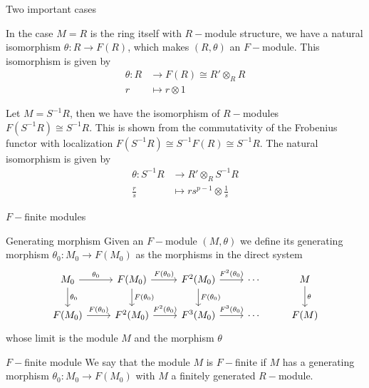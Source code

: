 \documentclass{beamer}
\begin{document}
\begin{frame}[fragile]{Two important cases}
\begin{block}{}
  In the case $M=R$ is the ring itself with  $R-$module structure, we have a natural isomorphism  $\theta : R \to F(R)$, which makes $(R, \theta )$ an $F-$module. This isomorphism is given by
  \begin{align*}
	\theta : R &\to F(R)\cong R' \otimes _R R \\
	r &\mapsto r \otimes 1
  \end{align*}
\end{block}
\begin{block}{}
Let  $M=S ^{-1}R$, then we have the isomorphism of $R-$modules $F(S^{-1}R)\cong S^{-1}R$. This is shown from the commutativity of the Frobenius functor with localization $F(S^{-1}R)\cong S^{-1}F(R)\cong S^{-1}R$. The natural isomorphism is given by
   \begin{align*}
	\theta : S ^{-1}R & \to R'\otimes _R S ^{-1}R\\
	\frac{r}{s} &\mapsto rs ^{p-1} \otimes \frac{1}{s}
   \end{align*}
\end{block}
\end{frame}


\begin{frame}[fragile]{$F-$finite modules}
\begin{block}{Generating morphism}
Given an $F-$module  $(M, \theta )$ we define its generating morphism  $\theta_0 :M_0 \to F(M_0)$ as the morphisms in the direct system 
\[\begin{tikzcd}
	{M_0} & {F(M_0)} & {F^2(M_0)} & \cdots & M \\
	{F(M_0)} & {F^2(M_0)} & {F^3(M_0)} & \cdots & {F(M)}
	\arrow["{\theta_0}", from=1-1, to=1-2]
	\arrow["{F(\theta_0)}", from=2-1, to=2-2]
	\arrow["{F^2(\theta_0)}", from=2-2, to=2-3]
	\arrow["{F(\theta_0)}", from=1-2, to=1-3]
	\arrow["{\theta_0}", from=1-1, to=2-1]
	\arrow["{F(\theta_0)}", from=1-2, to=2-2]
	\arrow["{F(\theta_0)}", from=1-3, to=2-3]
	\arrow["{F^2(\theta_0)}", from=1-3, to=1-4]
	\arrow["{F^3(\theta_0)}", from=2-3, to=2-4]
	\arrow["\theta", from=1-5, to=2-5]
\end{tikzcd}\]
whose limit is the module $M$ and the morphism $\theta$ 
\end{block}
\begin{block}{$F-$finite module}
We say that the module $M$ is  $F-$finite if  $M$ has a generating morphism  $\theta _0 : M_0 \to F(M_0)$ with $M$ a finitely generated  $R-$module.
\end{block}
\end{frame}
\end{document}
